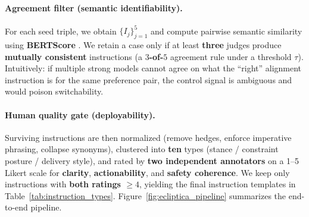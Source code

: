 \paragraph{Agreement filter (semantic identifiability).}
For each seed triple, we obtain $\{I_j\}_{j=1}^{5}$ and compute pairwise semantic similarity using
\textbf{BERTScore} \cite{zhang2019bertscore}.
We retain a case only if at least \textbf{three} judges produce \textbf{mutually consistent} instructions (a \textbf{$3$-of-$5$} agreement rule under a threshold $\tau$).
Intuitively: if multiple strong models cannot agree on what the “right” alignment instruction is for the same preference pair,
the control signal is ambiguous and would poison switchability.












\paragraph{Human quality gate (deployability).}
Surviving instructions are then normalized (remove hedges, enforce imperative phrasing, collapse synonyms),
clustered into \textbf{ten} types (stance / constraint posture / delivery style),
and rated by \textbf{two independent annotators} on a 1--5 Likert scale
for \textbf{clarity}, \textbf{actionability}, and \textbf{safety coherence}.
We keep only instructions with \textbf{both ratings $\ge 4$},
yielding the final instruction templates in Table~\ref{tab:instruction_types}.
Figure~\ref{fig:ecliptica_pipeline} summarizes the end-to-end pipeline.






























